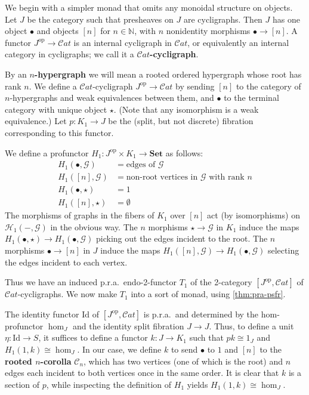 \documentclass{article}
\theoremstyle{definition}
\theoremstyle{remark}
\def\C{\mathcal{C}}
\def\G{\mathcal{G}}
\def\H{\mathcal{H}}
\def\Set{\mathbf{Set}}
\def\Cat{\ensuremath{\mathcal{C}\mathit{at}}}
\def\Id{\mathrm{Id}}
\def\op{^{\mathrm{op}}}
\def\N{\mathbb{N}}
\begin{document}
We begin with a simpler monad that omits any monoidal structure on objects.
Let $J$ be the category such that presheaves on $J$ are cycligraphs.
Then $J$ has one object $\bullet$ and objects $[n]$ for $n\in\N$, with $n$ nonidentity morphisms $\bullet\to [n]$.
A functor $J\op\to\Cat$ is an internal cycligraph in \Cat, or equivalently an internal category in cycligraphs; we call it a \textbf{\Cat-cycligraph}.

By an \textbf{$n$-hypergraph} we will mean a rooted ordered hypergraph whose root has rank $n$.
We define a \Cat-cycligraph $J\op\to\Cat$ by sending $[n]$ to the category of $n$-hypergraphs and weak equivalences between them, and $\bullet$ to the terminal category with unique object $\star$.
(Note that any isomorphism is a weak equivalence.)
Let $p:K_1 \to J$ be the (split, but not discrete) fibration corresponding to this functor.

We define a profunctor $H_1 : J\op\times K_1 \to \Set$ as follows:
\begin{align*}
  H_1(\bullet,\G) &= \text{edges of $\G$}\\
  H_1([n],\G) &= \text{non-root vertices in $\G$ with rank $n$}\\
  H_1(\bullet,\star) &= 1\\
  H_1([n],\star) &= \emptyset
\end{align*}
The morphisms of graphs in the fibers of $K_1$ over $[n]$ act (by isomorphisms) on $\H_1(-,\G)$ in the obvious way.
The $n$ morphisms $\star\to\G$ in $K_1$ induce the maps $H_1(\bullet,\star) \to H_1(\bullet,\G)$ picking out the edges incident to the root.
The $n$ morphisms $\bullet\to [n]$ in $J$ induce the maps $H_1([n],\G) \to H_1(\bullet,\G)$ selecting the edges incident to each vertex.

Thus we have an induced p.r.a.\ endo-2-functor $T_1$ of the 2-category $[J\op,\Cat]$ of \Cat-cycligraphs.
We now make $T_1$ into a sort of monad, using \cref{thm:pra-psfr}.

The identity functor $\Id$ of $[J\op,\Cat]$ is p.r.a.\ and determined by the hom-profunctor $\hom_J$ and the identity split fibration $J\to J$.
Thus, to define a unit $\eta : \Id \to S$, it suffices to define a functor $k:J\to K_1$ such that $p k\cong 1_J$ and $H_1(1,k) \cong \hom_J$.
In our case, we define $k$ to send $\bullet$ to $1$ and $[n]$ to the \textbf{rooted $n$-corolla} $\C_n$, which has two vertices (one of which is the root) and $n$ edges each incident to both vertices once in the same order.
It is clear that $k$ is a section of $p$, while inspecting the definition of $H_1$ yields $H_1(1,k) \cong \hom_J$.
\end{document}
